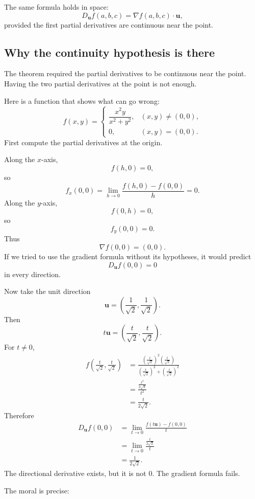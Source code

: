 The same formula holds in space:
\[
\boxed{
    D_{\mathbf u}f(a,b,c)
    =
    \nabla f(a,b,c)\cdot\mathbf u,
}
\]
provided the first partial derivatives are continuous near the point.

\subsection{Why the continuity hypothesis is there}

The theorem required the partial derivatives to be continuous near the point.  Having
the two partial derivatives at the point is not enough.

Here is a function that shows what can go wrong:
\[
    f(x,y)=
    \begin{cases}
    \dfrac{x^2y}{x^2+y^2}, & (x,y)\ne(0,0),\\[2mm]
    0, & (x,y)=(0,0).
    \end{cases}
\]
First compute the partial derivatives at the origin.

Along the \(x\)-axis,
\[
    f(h,0)=0,
\]
so
\[
    f_x(0,0)
    =
    \lim_{h\to0}\frac{f(h,0)-f(0,0)}{h}
    =
    0.
\]
Along the \(y\)-axis,
\[
    f(0,h)=0,
\]
so
\[
    f_y(0,0)=0.
\]
Thus
\[
    \nabla f(0,0)=(0,0).
\]
If we tried to use the gradient formula without its hypotheses, it would predict
\[
    D_{\mathbf u}f(0,0)=0
\]
in every direction.

Now take the unit direction
\[
    \mathbf u=\left(\frac1{\sqrt2},\frac1{\sqrt2}\right).
\]
Then
\[
    t\mathbf u
    =
    \left(\frac{t}{\sqrt2},\frac{t}{\sqrt2}\right).
\]
For \(t\ne0\),
\[
\begin{aligned}
    f\left(\frac{t}{\sqrt2},\frac{t}{\sqrt2}\right)
    &=
    \frac{\left(\frac{t}{\sqrt2}\right)^2\left(\frac{t}{\sqrt2}\right)}
    {\left(\frac{t}{\sqrt2}\right)^2+\left(\frac{t}{\sqrt2}\right)^2} \\
    &=
    \frac{\frac{t^3}{2\sqrt2}}{t^2} \\
    &=
    \frac{t}{2\sqrt2}.
\end{aligned}
\]
Therefore
\[
\begin{aligned}
D_{\mathbf u}f(0,0)
&=
\lim_{t\to0}
\frac{f(t\mathbf u)-f(0,0)}{t} \\
&=
\lim_{t\to0}
\frac{\frac{t}{2\sqrt2}}{t} \\
&=
\frac1{2\sqrt2}.
\end{aligned}
\]
The directional derivative exists, but it is not \(0\).  The gradient formula fails.

The moral is precise:

